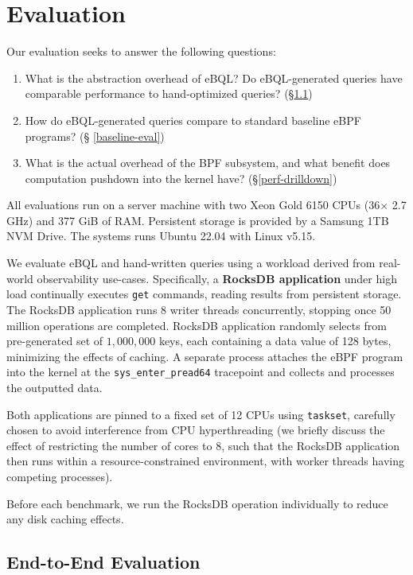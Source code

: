 \section{Evaluation}

Our evaluation seeks to answer the following questions:
\begin{enumerate}
    \item What is the abstraction overhead of eBQL? Do eBQL-generated queries have comparable
        performance to hand-optimized queries? (\S \ref{opt-eval})
    \item How do eBQL-generated queries compare to standard baseline eBPF programs? (\S
        \ref{baseline-eval})
    \item What is the actual overhead of the BPF subsystem, and what benefit does computation
        pushdown into the kernel have? (\S \ref{perf-drilldown})
\end{enumerate}

All evaluations run on a server machine with two Xeon Gold 6150 CPUs (36$\times $ 2.7 GHz) and 377
GiB of RAM. Persistent storage is provided by a Samsung 1TB NVM Drive. The systems runs Ubuntu 22.04
with Linux v5.15.

We evaluate eBQL and hand-written queries using a workload derived from real-world observability
use-cases. Specifically, a \textbf{RocksDB application} under high load continually executes
\texttt{get} commands, reading results from persistent storage. The RocksDB application runs $8$
writer threads concurrently, stopping once 50 million operations are completed.  RocksDB application
randomly selects from pre-generated set of $1,000,000$ keys, each containing a data value of 128
bytes, minimizing the effects of caching. A separate process attaches the eBPF program into the
kernel at the \texttt{sys\_enter\_pread64} tracepoint and collects and processes the outputted data.

Both applications are pinned to a fixed set of 12 CPUs using \texttt{taskset}, carefully chosen to
avoid interference from CPU hyperthreading (we briefly discuss the effect of restricting the number
of cores to 8, such that the RocksDB application then runs within a resource-constrained
environment, with worker threads having competing processes).

Before each benchmark, we run the RocksDB operation individually to reduce any disk caching effects.

\subsection{End-to-End Evaluation}
\label{opt-eval}

